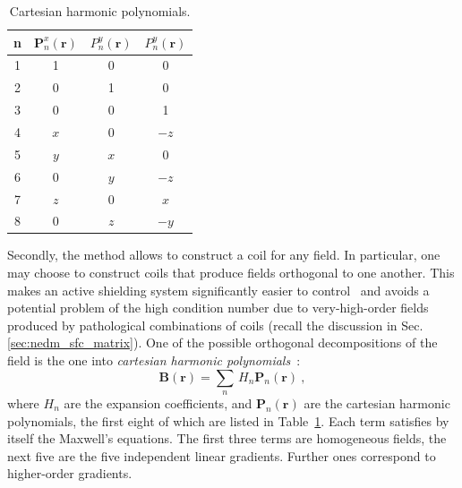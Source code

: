 \begin{table}
  \centering
  \begin{tabular}{c|ccc}
    n & $\mathbf{P}_n^x(\mathbf{r})$ & $P_n^y(\mathbf{r})$ & $P_n^y(\mathbf{r})$ \\ \midrule
    1 & 1 & 0 & 0 \\
    2 & 0 & 1 & 0 \\
    3 & 0 & 0 & 1 \\
    \midrule
    4 & $x$ &  0  & $-z$ \\
    5 & $y$ & $x$ &   0  \\
    6 &  0  & $y$ & $-z$ \\
    7 & $z$ &  0  & $ x$ \\
    8 &  0  & $z$ & $-y$ \\
  \end{tabular}
  \caption{Cartesian harmonic polynomials.}\label{tab:coils_cartesian_harmonics}
\end{table}

Secondly, the method allows to construct a coil for any field. In particular, one may choose to construct coils that produce fields orthogonal to one another. 
This makes an active shielding system significantly easier to control~\cite{MRM:MRM1910010107} and avoids a potential problem of the high condition number due to very-high-order fields produced by pathological combinations of coils (recall the discussion in Sec.\,\ref{sec:nedm_sfc_matrix}). One of the possible orthogonal decompositions of the field is the one into \emph{cartesian harmonic polynomials}~\cite{Franke2013}:
\begin{equation}
  \mathbf{B}(\mathbf{r}) = \sum_{n}\,H_n \mathbf{P}_n(\mathbf{r}) \ ,
\end{equation}
where $H_n$ are the expansion coefficients, and $\mathbf{P}_n(\mathbf{r})$ are the cartesian harmonic polynomials, the first eight of which are listed in Table~\ref{tab:coils_cartesian_harmonics}. Each term satisfies by itself the Maxwell's equations. The first three terms are homogeneous fields, the next five are the five independent linear gradients. Further ones correspond to higher-order gradients.

